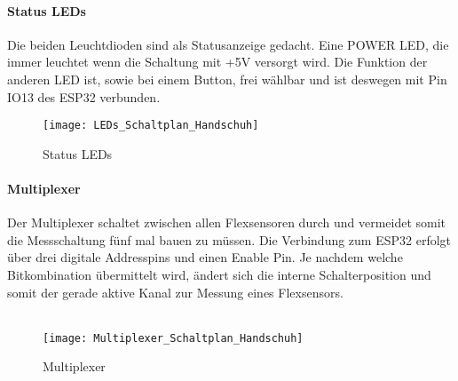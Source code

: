 \documentclass[titlepage,12pt,twoside]{article}
\begin{document}
\paragraph{Status LEDs}
\hfill \break
\hfill \break
Die beiden Leuchtdioden sind als Statusanzeige gedacht. Eine POWER LED, die immer leuchtet wenn die Schaltung mit +5V
versorgt wird. Die Funktion der anderen LED ist, sowie bei einem Button, frei wählbar und ist deswegen mit Pin IO13 des ESP32
verbunden. \\
\begin{figure}[H]
	\begin{center}
		\scalebox{0.45}
		{\texttt{[image: LEDs\_Schaltplan\_Handschuh]}}
		\caption{Status LEDs}
		\label{fig:LEDs_Schaltplan_Handschuh}		
	\end{center}
\end{figure}

\paragraph{Multiplexer}
\hfill \break
\hfill \break
Der Multiplexer schaltet zwischen allen Flexsensoren durch und vermeidet somit die Messschaltung fünf mal bauen zu müssen. 
Die Verbindung zum ESP32 erfolgt über drei digitale Addresspins und einen Enable Pin. Je nachdem welche Bitkombination übermittelt
wird, ändert sich die interne Schalterposition und somit der gerade aktive Kanal zur Messung eines Flexsensors. \\
\\
\begin{figure}[H]
	\begin{center}
		\scalebox{0.5}
		{\texttt{[image: Multiplexer\_Schaltplan\_Handschuh]}}
		\caption{Multiplexer}
		\label{fig:Multiplexer_Schaltplan_Handschuh}		
	\end{center}
\end{figure}
\end{document}

